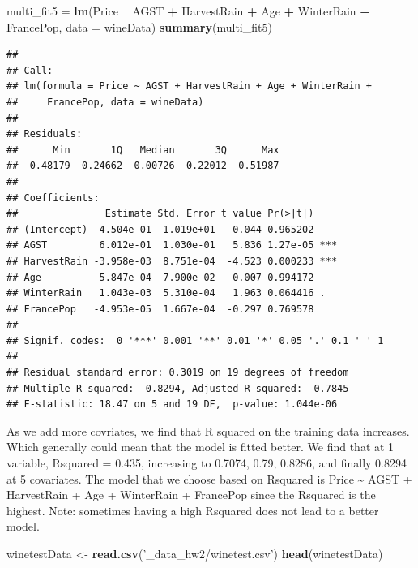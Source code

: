 \documentclass[
]{article}
\newenvironment{Shaded}{\begin{snugshade}}{\end{snugshade}}
\newcommand{\DataTypeTok}[1]{\textcolor[rgb]{0.13,0.29,0.53}{#1}}
\newcommand{\KeywordTok}[1]{\textcolor[rgb]{0.13,0.29,0.53}{\textbf{#1}}}
\newcommand{\NormalTok}[1]{#1}
\newcommand{\OperatorTok}[1]{\textcolor[rgb]{0.81,0.36,0.00}{\textbf{#1}}}
\newcommand{\StringTok}[1]{\textcolor[rgb]{0.31,0.60,0.02}{#1}}
\begin{document}
\begin{Shaded}
\begin{Highlighting}[]
\NormalTok{multi_fit5 =}\StringTok{ }\KeywordTok{lm}\NormalTok{(Price }\OperatorTok{~}\StringTok{ }\NormalTok{AGST }\OperatorTok{+}\StringTok{ }\NormalTok{HarvestRain }\OperatorTok{+}\StringTok{ }\NormalTok{Age }\OperatorTok{+}\StringTok{ }\NormalTok{WinterRain }\OperatorTok{+}\StringTok{ }\NormalTok{FrancePop, }\DataTypeTok{data =}\NormalTok{ wineData)}
\KeywordTok{summary}\NormalTok{(multi_fit5)}
\end{Highlighting}
\end{Shaded}

\begin{verbatim}
## 
## Call:
## lm(formula = Price ~ AGST + HarvestRain + Age + WinterRain + 
##     FrancePop, data = wineData)
## 
## Residuals:
##      Min       1Q   Median       3Q      Max 
## -0.48179 -0.24662 -0.00726  0.22012  0.51987 
## 
## Coefficients:
##               Estimate Std. Error t value Pr(>|t|)    
## (Intercept) -4.504e-01  1.019e+01  -0.044 0.965202    
## AGST         6.012e-01  1.030e-01   5.836 1.27e-05 ***
## HarvestRain -3.958e-03  8.751e-04  -4.523 0.000233 ***
## Age          5.847e-04  7.900e-02   0.007 0.994172    
## WinterRain   1.043e-03  5.310e-04   1.963 0.064416 .  
## FrancePop   -4.953e-05  1.667e-04  -0.297 0.769578    
## ---
## Signif. codes:  0 '***' 0.001 '**' 0.01 '*' 0.05 '.' 0.1 ' ' 1
## 
## Residual standard error: 0.3019 on 19 degrees of freedom
## Multiple R-squared:  0.8294, Adjusted R-squared:  0.7845 
## F-statistic: 18.47 on 5 and 19 DF,  p-value: 1.044e-06
\end{verbatim}

As we add more covriates, we find that R squared on the training data
increases. Which generally could mean that the model is fitted better.
We find that at 1 variable, Rsquared = 0.435, increasing to 0.7074,
0.79, 0.8286, and finally 0.8294 at 5 covariates. The model that we
choose based on Rsquared is Price \textasciitilde{} AGST + HarvestRain +
Age + WinterRain + FrancePop since the Rsquared is the highest. Note:
sometimes having a high Rsquared does not lead to a better model.

\begin{Shaded}
\begin{Highlighting}[]
\NormalTok{winetestData <-}\StringTok{ }\KeywordTok{read.csv}\NormalTok{(}\StringTok{'_data_hw2/winetest.csv'}\NormalTok{)}
\KeywordTok{head}\NormalTok{(winetestData)}
\end{Highlighting}
\end{Shaded}
\end{document}
